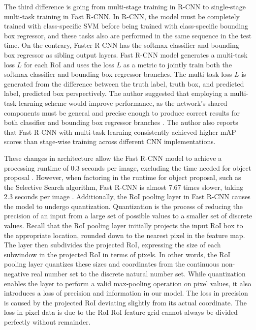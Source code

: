 The third difference is going from multi-stage training in R-CNN to single-stage multi-task training in Fast R-CNN. In R-CNN, the model must be completely trained with class-specific SVM before being trained with class-specific bounding box regressor, and these tasks also are performed in the same sequence in the test time. On the contrary, Faster R-CNN has the softmax classifier and bounding box regressor as sibling output layers. Fast R-CNN model generates a multi-task loss $L$ for each RoI and uses the loss $L$ as a metric to jointly train both the softmax classifier and bounding box regressor branches. The multi-task loss $L$ is generated from the difference between the truth label, truth box, and predicted label, predicted box perspectively. The author suggested that employing a multi-task learning scheme would improve performance, as the network's shared components must be general and precise enough to produce correct results for both classifier and bounding box regressor branches \cite{fast_rcnn_og}. The author also reports that Fast R-CNN with multi-task learning consistently achieved higher mAP scores than stage-wise training across different CNN implementations.

These changes in architecture allow the Fast R-CNN model to achieve a processing runtime of 0.3 seconds per image, excluding the time needed for object proposal \cite{fast_rcnn_og}. However, when factoring in the runtime for object proposal, such as the Selective Search algorithm, Fast R-CNN is almost 7.67 times slower, taking 2.3 seconds per image \cite{selective_search_2013}. Additionally, the RoI pooling layer in Fast R-CNN causes the model to undergo quantization. Quantization is the process of reducing the precision of an input from a large set of possible values to a smaller set of discrete values. Recall that the RoI pooling layer initially projects the input RoI box to the appropriate location, rounded down to the nearest pixel in the feature map. The layer then subdivides the projected RoI, expressing the size of each subwindow in the projected RoI in terms of pixels. In other words, the RoI pooling layer quantizes these sizes and coordinates from the continuous non-negative real number set to the discrete natural number set. While quantization enables the layer to perform a valid max-pooling operation on pixel values, it also introduces a loss of precision and information in our model. The loss in precision is caused by the projected RoI deviating slightly from its actual coordinate. The loss in pixel data is due to the RoI RoI feature grid cannot always be divided perfectly without remainder.

